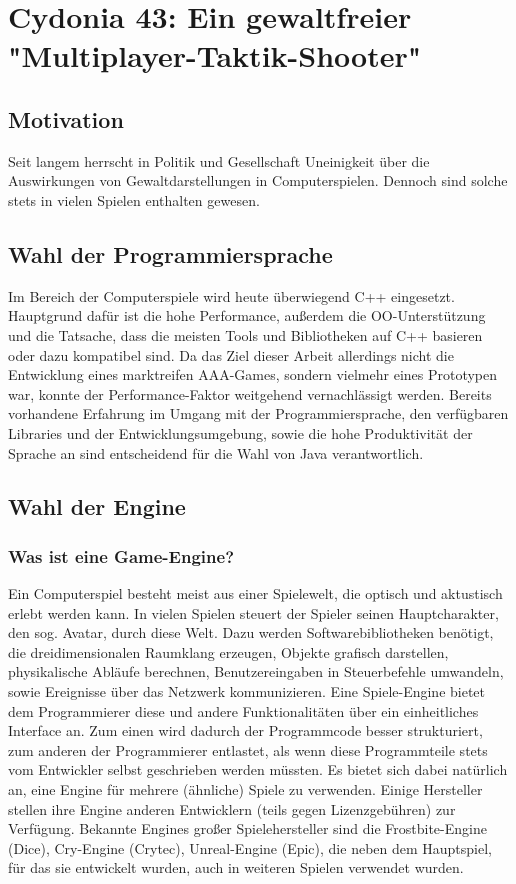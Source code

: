 \documentclass{article}
\begin{document}
\section{Cydonia 43: Ein gewaltfreier "Multiplayer-Taktik-Shooter"}

\subsection{Motivation}

Seit langem herrscht in Politik und Gesellschaft Uneinigkeit über die Auswirkungen von Gewaltdarstellungen in
Computerspielen. Dennoch sind solche stets in vielen Spielen enthalten gewesen.

\subsection{Wahl der Programmiersprache}

Im Bereich der Computerspiele wird heute überwiegend C++ eingesetzt. Hauptgrund dafür ist die hohe Performance, außerdem
die OO-Unterstützung und die Tatsache, dass die meisten Tools und Bibliotheken auf C++ basieren oder dazu kompatibel
sind. Da das Ziel dieser Arbeit allerdings nicht die Entwicklung eines marktreifen AAA-Games, sondern vielmehr eines
Prototypen war, konnte der Performance-Faktor weitgehend vernachlässigt werden. Bereits vorhandene Erfahrung im Umgang
mit der Programmiersprache, den verfügbaren Libraries und der Entwicklungsumgebung, sowie die hohe Produktivität der
Sprache an sind entscheidend für die Wahl von Java verantwortlich.

\subsection{Wahl der Engine}

\subsubsection{Was ist eine Game-Engine?}

Ein Computerspiel besteht meist aus einer Spielewelt, die optisch und aktustisch erlebt werden kann. In vielen Spielen
steuert der Spieler seinen Hauptcharakter, den sog. Avatar, durch diese Welt. Dazu werden Softwarebibliotheken benötigt,
die dreidimensionalen Raumklang erzeugen, Objekte grafisch darstellen, physikalische Abläufe berechnen, Benutzereingaben
in Steuerbefehle umwandeln, sowie Ereignisse über das Netzwerk kommunizieren. Eine Spiele-Engine bietet dem
Programmierer diese und andere Funktionalitäten über ein einheitliches Interface an. Zum einen wird dadurch der
Programmcode besser strukturiert, zum anderen der Programmierer entlastet, als wenn diese Programmteile stets vom
Entwickler selbst geschrieben werden müssten.
Es bietet sich dabei natürlich an, eine Engine für mehrere (ähnliche) Spiele zu verwenden. Einige Hersteller stellen
ihre Engine anderen Entwicklern (teils gegen Lizenzgebühren) zur Verfügung. Bekannte Engines großer Spielehersteller
sind die Frostbite-Engine (Dice), Cry-Engine (Crytec), Unreal-Engine (Epic), die neben dem Hauptspiel, für das sie
entwickelt wurden, auch in weiteren Spielen verwendet wurden.
\end{document}
